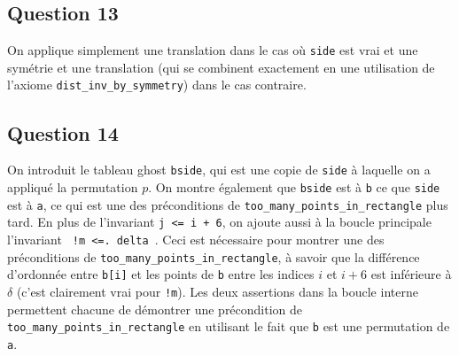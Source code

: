 \documentclass[11pt, openany, a4paper]{article}
\begin{document}
\subsection*{Question 13}

On applique simplement une translation dans le cas où \texttt{side} est vrai et une symétrie et une translation (qui se combinent exactement en une utilisation de l'axiome \texttt{dist\_inv\_by\_symmetry}) dans le cas contraire.

\subsection*{Question 14}

On introduit le tableau ghost \texttt{bside}, qui est une copie de \texttt{side} à laquelle on a appliqué la permutation $p$. On montre également que \texttt{bside} est à \texttt{b} ce que \texttt{side} est à \texttt{a}, ce qui est une des préconditions de \texttt{too\_many\_points\_in\_rectangle} plus tard. En plus de l'invariant \texttt{j <= i + 6}, on ajoute aussi à la boucle principale l'invariant \texttt{ !m <=. delta }. Ceci est nécessaire pour montrer une des préconditions de \texttt{too\_many\_points\_in\_rectangle}, à savoir que la différence d'ordonnée entre \texttt{b[i]} et les points de \texttt{b} entre les indices $i$ et $i+6$ est inférieure à $\delta$ (c'est clairement vrai pour \texttt{!m}). Les deux assertions dans la boucle interne permettent chacune de démontrer une précondition de \texttt{too\_many\_points\_in\_rectangle} en utilisant le fait que \texttt{b} est une permutation de \texttt{a}.
\end{document}
